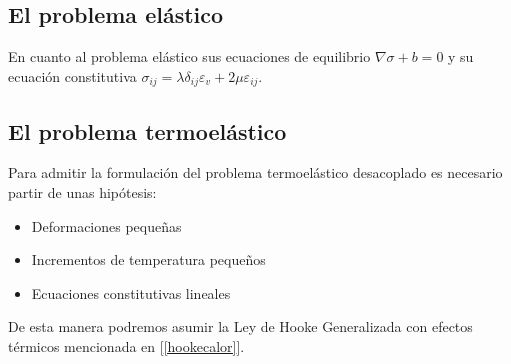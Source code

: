 \documentclass[11pt,a4paper]{article}
\begin{document}
\subsection{El problema elástico}
En cuanto al problema elástico sus ecuaciones de equilibrio $\nabla \sigma +b =0$ y su ecuación constitutiva $\sigma_{ij}=\lambda \delta_{ij} \varepsilon_{v} + 2 \mu \varepsilon_{ij}$.
\subsection{El problema termoelástico}
Para admitir la formulación del problema termoelástico desacoplado es necesario partir de unas hipótesis: \begin{itemize}
\item Deformaciones pequeñas
\item Incrementos de temperatura pequeños
\item Ecuaciones constitutivas lineales
\end{itemize}
De esta manera podremos asumir la Ley de Hooke Generalizada con efectos térmicos mencionada en [\ref{hookecalor}].
\end{document}
